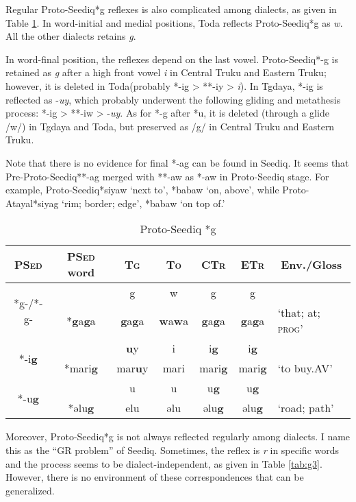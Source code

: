 \documentclass[12pt]{article}
\newcommand{\pataf}{Proto-Atayal\xspace}
\newcommand{\psed}{\textsc{PSed}\xspace}
\newcommand{\psedf}{Proto-Seediq\xspace}
\newcommand{\stg}{\textsc{Tg}\xspace}
\newcommand{\stgf}{Tgdaya\xspace}
\newcommand{\sto}{\textsc{To}\xspace}
\newcommand{\stof}{Toda\xspace}
\newcommand{\sctr}{\textsc{CTr}\xspace}
\newcommand{\sctrf}{Central Truku\xspace}
\newcommand{\setr}{\textsc{ETr}\xspace}
\newcommand{\setrf}{Eastern Truku\xspace}
\begin{document}
Regular \psedf *g reflexes is also complicated among dialects, as given in Table \ref{tab:g}.  In word-initial and medial positions, \stof reflects \psedf *g as \textit{w}. All the other dialects retains \textit{g}. 

In word-final position, the reflexes depend on the last vowel. \psedf *-g is retained as \textit{g} after a high front vowel \textit{i} in \sctrf and \setrf; however, it is deleted in \stof (probably *-ig > **-iy > \textit{i}). In \stgf, *-ig is reflected as -\textit{uy}, which probably underwent the following gliding and metathesis process: *-ig > **-iw > -\textit{uy}. As for *-g after *u, it is deleted (through a glide /w/) in \stgf and \stof, but preserved as /g/ in \sctrf and \setrf. 

Note that there is no evidence for final *-ag can be found in Seediq. It seems that Pre-\psedf **-ag merged with **-aw as *-aw in \psedf stage. For example, \psedf *siyaw `next to', *babaw `on, above', while \pataf *siyag `rim; border; edge', *babaw `on top of.' 

\begin{table}[!htbp]
\centering
\caption{Proto-Seediq *g}
\label{tab:g}
\begin{tabular}{c|c|cccc|l}
\textbf{\psed} & \textbf{\psed word}      & \textbf{\stg} & \textbf{\sto} & \textbf{\sctr} & \textbf{\setr} & \multicolumn{1}{c}{\textbf{Env./Gloss}} \\ \hline
\multirow{2}{*}{*g-/*-g-}   & & g  & w  & g  & g  &  \\ \cline{2-7}
                            & *\textbf{g}a\textbf{g}a & \textbf{g}a\textbf{g}a & \textbf{w}a\textbf{w}a & \textbf{g}a\textbf{g}a & \textbf{g}a\textbf{g}a & `that; at; \textsc{prog}' \\ \hline
\multirow{2}{*}{*-i\textbf{g}}  & & \textbf{u}y & i  & i\textbf{g} & i\textbf{g} &  \\ \cline{2-7}
                                & *mari\textbf{g} & mar\textbf{u}y & mari & mari\textbf{g} & mari\textbf{g} & `to buy.AV' \\ \hline
\multirow{2}{*}{*-u\textbf{g}}  & & u  & u  & u\textbf{g} & u\textbf{g} &  \\ \cline{2-7}
                                & *əlu\textbf{g} & elu & əlu & əlu\textbf{g} & əlu\textbf{g} & `road; path' \\ \hline
\end{tabular}
\end{table}

Moreover, \psedf *g is not always reflected regularly among dialects. I name this as the ``GR problem'' of Seediq. Sometimes, the reflex is \textit{r} in specific words and the process seems to be dialect-independent, as given in Table \ref{tab:g3}. However, there is no environment of these correspondences that can be generalized. 
\end{document}
